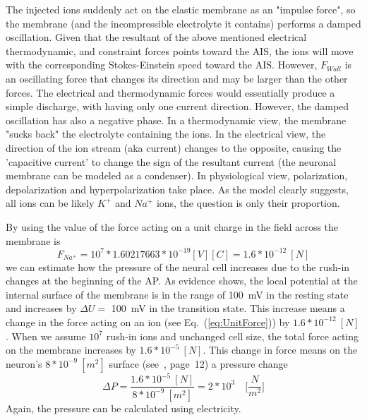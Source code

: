 The injected ions suddenly act on the elastic membrane as an "impulse force", so the membrane (and the incompressible electrolyte it contains) performs a damped oscillation.
Given that the resultant of the above mentioned  electrical
thermodynamic, and constraint forces points toward the \gls{AIS}, the ions will move with the corresponding Stokes-Einstein speed toward the \gls{AIS}. However, $F_{Wall}$ is an oscillating force that changes its direction and may be larger than the 
other forces.
The electrical and thermodynamic forces would essentially produce a simple discharge, with having
only one current direction. However, the
damped oscillation has also a negative phase.
In a thermodynamic view, the membrane "sucks back"
the electrolyte containing the ions. In the electrical view,
the direction of the ion stream (aka current) changes to the opposite, causing the 'capacitive current' to change
the sign of the resultant current (the neuronal membrane
can be modeled as a condenser).  In physiological view, 
polarization, depolarization and hyperpolarization take place. As the model clearly suggests, all ions can be likely 
$K^+$ and $Na^+$ ions, the question is only their proportion.


	By using the value of the force acting on a unit charge
	in the field across the membrane is
	\begin{equation}
		F_{Na^+}= 10^7 *1.60217663* 10^{-19} [V] [C] = 1.6*10^{-12}\ [N] \label{eq:UnitForce}
	\end{equation}
	we can estimate how the pressure of the neural cell increases due to the rush-in changes at the beginning of the
	\gls{AP}. 
	As evidence shows, the local potential at the internal surface of the membrane is in the range of \SI{100}{\milli\volt} in the resting state and increases by $\Delta U=$ \SI{100}{\milli\volt}  in the transition state. This increase means a change in the force acting on an ion (see Eq.~(\ref{eq:UnitForce})) by  $1.6*10^{-12}\ [N]$.
	When we assume $10^7$ rush-in ions and unchanged cell size, the total force acting on the membrane increases by $1.6*10^{-5}\ [N]$.
	This change in force means on the neuron's $8*10^{-9}\ [m^2]$ surface (see~\cite{JohnstonWuNeurophysiology:1995}, page~12) a pressure change 
	\begin{equation}
		\Delta P = \frac{1.6*10^{-5}\ [N]}{8*10^{-9}\ [m^2]}
		= 2*10^{3}\quad \biggl[\frac{N}{m^2}\biggr]
		\label{eq:CellPressureChange}
	\end{equation}
	\noindent Again, the pressure can be calculated 
	using electricity.

